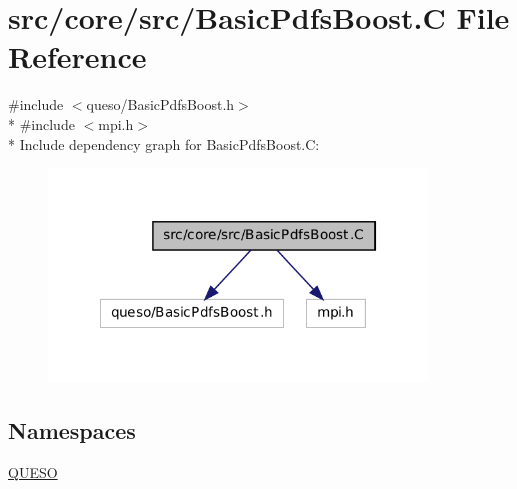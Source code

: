 \hypertarget{_basic_pdfs_boost_8_c}{\section{src/core/src/\-Basic\-Pdfs\-Boost.C File Reference}
\label{_basic_pdfs_boost_8_c}
}
{\ttfamily \#include $<$queso/\-Basic\-Pdfs\-Boost.\-h$>$}\\*
{\ttfamily \#include $<$mpi.\-h$>$}\\*
Include dependency graph for Basic\-Pdfs\-Boost.\-C\-:
\nopagebreak
\begin{figure}[H]
\begin{center}
\leavevmode
\includegraphics[width=285pt]{_basic_pdfs_boost_8_c__incl}
\end{center}
\end{figure}
\subsection*{Namespaces}
\begin{DoxyCompactItemize}
\item 
\hyperlink{namespace_q_u_e_s_o}{Q\-U\-E\-S\-O}
\end{DoxyCompactItemize}
